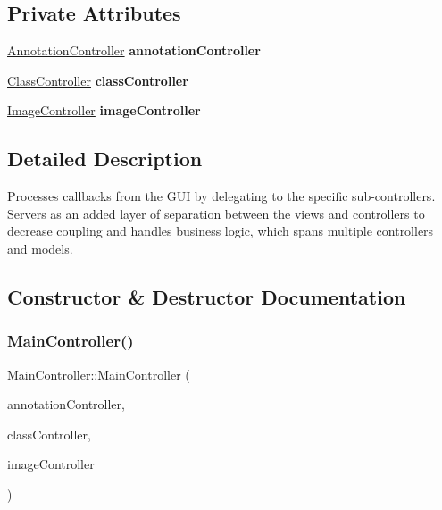 \subsection*{Private Attributes}
\begin{DoxyCompactItemize}
\item 
\mbox{\label{classMainController_af065a8fdd42311f90d96b68f77f2248f}} 
\hyperlink{classAnnotationController}{Annotation\+Controller} {\bfseries annotation\+Controller}
\item 
\mbox{\label{classMainController_a5061629143625f07d1131a4ea8d39d73}} 
\hyperlink{classClassController}{Class\+Controller} {\bfseries class\+Controller}
\item 
\mbox{\label{classMainController_a6553221dd7d26251572bd730fdd9aae5}} 
\hyperlink{classImageController}{Image\+Controller} {\bfseries image\+Controller}
\end{DoxyCompactItemize}


\subsection{Detailed Description}
Processes callbacks from the G\+UI by delegating to the specific sub-\/controllers. Servers as an added layer of separation between the views and controllers to decrease coupling and handles business logic, which spans multiple controllers and models. 

\subsection{Constructor \& Destructor Documentation}
\mbox{\label{classMainController_a1ec0f2ef4a8efce169354c525afec025}} 
\subsubsection{\texorpdfstring{Main\+Controller()}{MainController()}}
{\footnotesize\ttfamily Main\+Controller\+::\+Main\+Controller (\begin{DoxyParamCaption}\item[{\hyperlink{classAnnotationController}{Annotation\+Controller} \&}]{annotation\+Controller,  }\item[{\hyperlink{classClassController}{Class\+Controller} \&}]{class\+Controller,  }\item[{\hyperlink{classImageController}{Image\+Controller} \&}]{image\+Controller }\end{DoxyParamCaption})}



